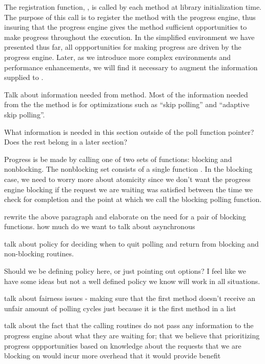 The registration function, , is called by each
method at library initialization time.  The purpose of this call is to register
the method with the progress engine, thus insuring that the progress engine
gives the method sufficient opportunities to make progress throughout the
execution.  In the simplified environment we have presented thus far, all
oppportunities for making progress are driven by the progress engine.  Later,
as we introduce more complex environments and performance enhancements, we will
find it necessary to augment the information supplied to
.

\todo Talk about information needed from method.  Most of the information needed from the the method is for optimizations such as ``skip polling'' and ``adaptive skip polling''.

\Q What information is needed in this section outside of the poll function
pointer?  Does the rest belong in a later section?

Progress is be made by calling one of two sets of functions: blocking and
nonblocking.  The nonblocking set consists of a single function
.  In the blocking case, we need to worry more
about atomicity since we don't want the progress engine blocking if the
request we are waiting was satisfied between the time we check for completion
and the point at which we call the
blocking polling function.  

\todo [BRT] rewrite the above paragraph and elaborate on the need for a pair
of blocking functions.  how much do we want to talk about asynchronous 

\todo talk about policy for deciding when to quit polling and return from
blocking and non-blocking routines.

\Q [BRT] Should we be defining policy here, or just pointing out options?  I
feel like we have some ideas but not a well defined policy we know will work in
all situations.  

\todo talk about fairness issues - making sure that the first method doesn't
receive an unfair amount of polling cycles just because it is the first method
in a list

\todo talk about the fact that the calling routines do not pass any information
to the progress engine about what they are waiting for; that we believe that
prioritizing progress oppportunities based on knowledge about the requests that
we are blocking on would incur more overhead that it would provide benefit


